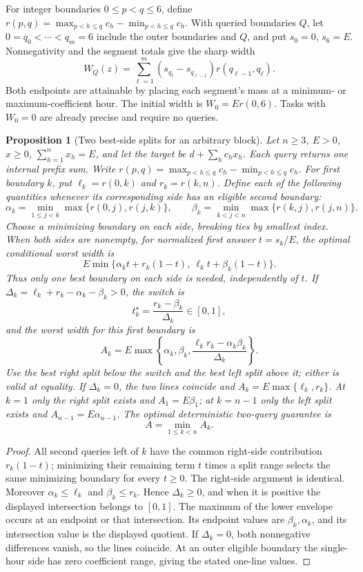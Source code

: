 \documentclass[12pt]{article}
\newtheorem{proposition}{Proposition}
\begin{document}
For integer boundaries $0\leq p<q\leq6$, define
$r(p,q)=\max_{p<h\leq q}c_h-\min_{p<h\leq q}c_h$.
With queried boundaries $Q$, let $0=q_0<\cdots<q_m=6$ include
the outer boundaries and $Q$, and put $s_0=0$, $s_6=E$.
Nonnegativity and the segment totals give the sharp width
\begin{equation}
 W_Q(z)=\sum_{\ell=1}^{m}
 (s_{q_\ell}-s_{q_{\ell-1}})r(q_{\ell-1},q_\ell).
 \label{eq:counter-width}
\end{equation}
Both endpoints are attainable by placing each segment's mass at a
minimum- or maximum-coefficient hour. The initial width is $W_0=Er(0,6)$.
Tasks with $W_0=0$ are already precise and require no queries.

\begin{proposition}[Two best-side splits for an arbitrary block]\label{prop:counter-two-query}
Let $n\geq3$, $E>0$, $x\geq0$, $\sum_{h=1}^n x_h=E$, and let the target be
$d+\sum_hc_hx_h$. Each query returns one internal prefix sum. Write
$r(p,q)=\max_{p<h\leq q}c_h-\min_{p<h\leq q}c_h$.
For first boundary $k$, put $\ell_k=r(0,k)$ and $r_k=r(k,n)$.
Define each of the following quantities whenever its corresponding
side has an eligible second boundary:
\[
 \alpha_k=\min_{1\leq j<k}\max\{r(0,j),r(j,k)\},\qquad
 \beta_k=\min_{k<j<n}\max\{r(k,j),r(j,n)\}.
\]
Choose a minimizing boundary on each side, breaking ties by smallest index.
When both sides are nonempty, for normalized first answer $t=s_k/E$,
the optimal conditional worst width is
\[
 E\min\{\alpha_k t+r_k(1-t),\ \ell_k t+\beta_k(1-t)\}.
\]
Thus only one best boundary on each side is needed, independently of $t$.
If $\Delta_k=\ell_k+r_k-\alpha_k-\beta_k>0$, the switch is
\[
 t_k^\star=\frac{r_k-\beta_k}{\Delta_k}\in[0,1],
\]
and the worst width for this first boundary is
\[
 A_k=E\max\left\{\alpha_k,\beta_k,
          \frac{\ell_kr_k-\alpha_k\beta_k}{\Delta_k}\right\}.
\]
Use the best right split below the switch and the best left split above
it; either is valid at equality. If $\Delta_k=0$, the two lines coincide
and $A_k=E\max\{\ell_k,r_k\}$. At $k=1$ only the right split exists and
$A_1=E\beta_1$; at $k=n-1$ only the left split exists and
$A_{n-1}=E\alpha_{n-1}$. The optimal deterministic two-query guarantee is
\begin{equation} A=\min_{1\leq k<n} A_k.\label{eq:counter-adaptive-value}\end{equation}
\end{proposition}
\begin{proof}
All second queries left of $k$ have the common right-side contribution
$r_k(1-t)$; minimizing their remaining term $t$ times a split range
selects the same minimizing boundary for every $t\geq0$. The right-side
argument is identical. Moreover $\alpha_k\leq\ell_k$ and
$\beta_k\leq r_k$. Hence $\Delta_k\geq0$, and when it is positive the
displayed intersection belongs to $[0,1]$. The maximum of the lower
envelope occurs at an endpoint or that intersection. Its endpoint
values are $\beta_k,\alpha_k$, and its intersection value is the displayed
quotient. If $\Delta_k=0$, both nonnegative differences vanish, so the
lines coincide. At an outer eligible boundary the single-hour side has
zero coefficient range, giving the stated one-line values.
\end{proof}
\end{document}
